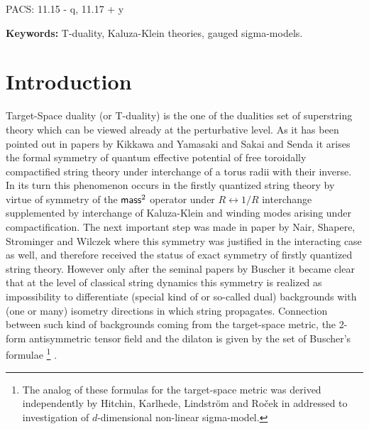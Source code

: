 \documentclass[a4paper,11pt]{article}
\begin{document}



\vspace{2.8cm}

PACS: 11.15 - q, 11.17 + y

\vspace{0.8cm}
{\bf Keywords:} T-duality, Kaluza-Klein theories, gauged sigma-models.

\newpage



\section{Introduction}

Target-Space duality (or T-duality) is the one of the dualities
set of superstring theory which can be viewed already at the
perturbative level. As it has been pointed out in papers by
Kikkawa and Yamasaki \cite{ky} and Sakai and Senda \cite{ss} 
it arises the formal symmetry of quantum effective potential of 
free toroidally compactified string theory
under interchange of a
torus radii with their inverse. In its turn this phenomenon occurs
in the firstly quantized string theory by virtue of symmetry of
the ${\sf mass}^2$ operator under $R \leftrightarrow 1/R$
interchange supplemented by interchange of Kaluza-Klein and
winding modes arising under compactification.
The next important step was made in paper by Nair, Shapere,
Strominger and Wilczek \cite{dssw} where this symmetry was
justified in the interacting case as well, and therefore received the
status of exact symmetry of firstly quantized string theory.
However only after the seminal papers by Buscher \cite{buscher} it
became clear that at the level of classical string dynamics this
symmetry is realized as impossibility to differentiate (special
kind of or so-called dual) backgrounds with (one or many)
isometry directions in which string propagates. Connection
between such kind of backgrounds coming from the target-space
metric, the 2-form antisymmetric tensor field and the dilaton is
given by the set of Buscher's formulae
\footnote{The analog of these formulas for the target-space metric was derived
independently by Hitchin, Karlhede, Lindstr{\"o}m and Ro{\v{c}}ek
in \cite{hklr} addressed to investigation of $d$-dimensional
non-linear sigma-model.}
\cite{buscher}.
\end{document}
